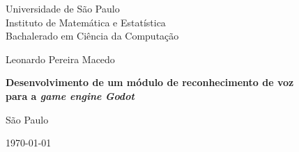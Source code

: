 \thispagestyle{empty}
\begin{center}
    \vspace*{2.3cm}
    Universidade de São Paulo \\
    Instituto de Matemática e Estatística \\
    Bachalerado em Ciência da Computação


    \vspace*{3cm}
    \large{Leonardo Pereira Macedo}


    \vspace{3cm}
    \textbf{\large{Desenvolvimento de um módulo de reconhecimento de voz \\
    para a \textit{game engine} \textit{Godot}}}


    \vskip 5cm
    \normalsize{São Paulo}

    \today
\end{center}
